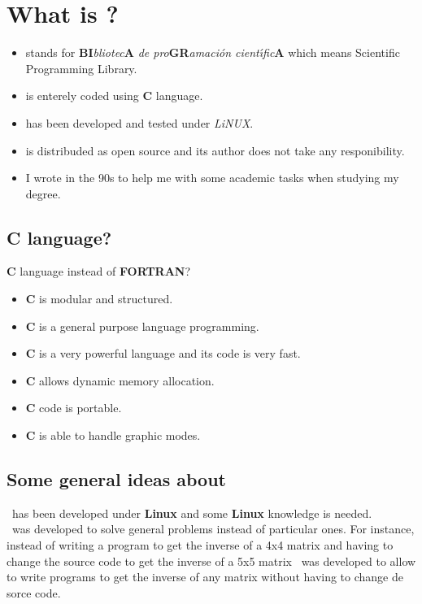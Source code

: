 %
%

\chapter{What is \BI?}

\begin{itemize}

\item \BI stands for \textbf{BI}\emph{bliotec}\textbf{A} \emph{de pro}\textbf{GR}\emph{amaci\'on cient\'{\i}fic}\textbf{A} which means Scientific Programming Library.
\item \BI is enterely coded using \textbf{C} language.
\item \BI has been developed and tested under \emph{LiNUX}.
\item \BI is distribuded as open source and its author does not take any responibility.
\item I wrote \BI in the 90s to help me with some academic tasks when studying my degree.

\end{itemize}

\section{C language?}

\textbf{C} language instead of \textbf{FORTRAN}?
%
\begin{itemize}
\item \textbf{C} is modular and structured.
\item \textbf{C} is a general purpose language programming.
\item \textbf{C} is a very powerful language and its code is very fast.
\item \textbf{C} allows dynamic memory allocation.
\item \textbf{C} code is portable.
\item \textbf{C} is able to handle graphic modes. 
\end{itemize}

\section{Some general ideas about \BI}

\BI\ has been developed under \textbf{Linux} and some \textbf{Linux} knowledge is needed.\\

\BI\ was developed to solve general problems instead of particular ones. For instance, instead of writing a program to get the inverse of a 4x4 matrix and having to change the source code to get the inverse of a 5x5 matrix \BI\ was developed to allow to write programs to get the inverse of any matrix without having to change de sorce code.\\

